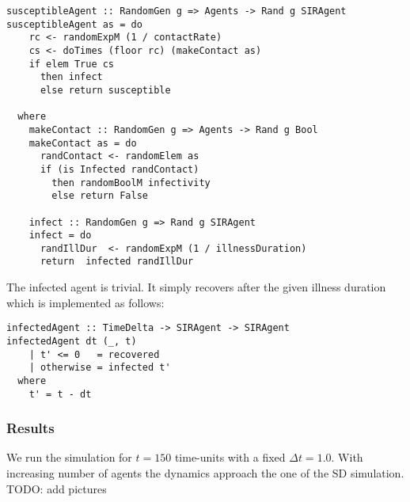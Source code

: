 \begin{verbatim}
susceptibleAgent :: RandomGen g => Agents -> Rand g SIRAgent
susceptibleAgent as = do
    rc <- randomExpM (1 / contactRate)
    cs <- doTimes (floor rc) (makeContact as)
    if elem True cs
      then infect
      else return susceptible

  where
    makeContact :: RandomGen g => Agents -> Rand g Bool
    makeContact as = do
      randContact <- randomElem as
      if (is Infected randContact)
        then randomBoolM infectivity
        else return False

    infect :: RandomGen g => Rand g SIRAgent
    infect = do
      randIllDur  <- randomExpM (1 / illnessDuration)
      return  infected randIllDur
\end{verbatim}

The infected agent is trivial. It simply recovers after the given illness duration which is implemented as follows:

\begin{verbatim}
infectedAgent :: TimeDelta -> SIRAgent -> SIRAgent
infectedAgent dt (_, t) 
    | t' <= 0   = recovered
    | otherwise = infected t'
  where
    t' = t - dt  
\end{verbatim}

\subsubsection{Results}
We run the simulation for $t = 150$ time-units with a fixed $\Delta t = 1.0$. With increasing number of agents the dynamics approach the one of the SD simulation. TODO: add pictures

